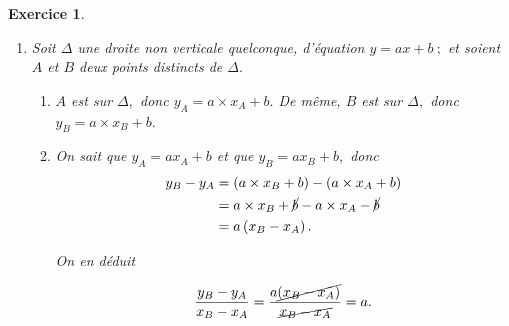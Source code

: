 \documentclass[10pt]{article}
\newtheorem{exo}{Exercice}
\begin{document}
\begin{exo}
\begin{enumerate}
\begin{enumerate}
\begin{multicols}{2}
\begin{center}
\end{center}
\end{multicols}
\item Quand $x$ augmente de 1, $y$ augmente de 2.

En effet, dans le tableau précédent, les valeurs de $x$ augmente de 1 en 1~; tandis les valeurs de $y$ augmentent de 2 en 2. On l'observe bien sur le graphique également.

\medskip

\textbf{Remarque~:} Cela vient du  \fg~{} de l'équation $y=2x+1~:$ si $x$ augmente de $1,$ alors $2x$ augmente de $2.$ C'est la méthode que l'on utilisera pour vérifier graphiquement la valeur du coefficient directeur (cf les \og $+2$ \fg~{} sur le graphique)~; elle est généralisée dans la question suivante.
\end{enumerate}

\item Soit $\Delta$  une droite non verticale quelconque, d’équation $y=ax+b~;$ et soient $A$ et $B$ deux points distincts de  $\Delta.$
\begin{enumerate}
\item
 $A$ est sur $\Delta,$ donc $y_A=a\times x_A+b.$ De même, $B$ est sur $\Delta,$ donc $y_B=a\times x_B+b.$
\item On sait que $y_A=ax_A+b$ et que $y_B=ax_B+b,$ donc
\begin{align*}y_B-y_A&=\left(a\times x_B+b\right)-\left(a\times x_A+b\right)\\
&=a\times x_B+\cancel{b}-a\times x_A-\cancel{b}\\
&=a\left(x_B-x_A\right).
\end{align*}

On en déduit

\[\frac{y_B-y_A}{x_B-x_A}=\frac{a\cancel{\left(x_B-x_A\right)}}{\cancel{x_B-x_A}}=a.\]
\end{enumerate}
\end{enumerate}
\end{exo}

\newpage
\end{document}
